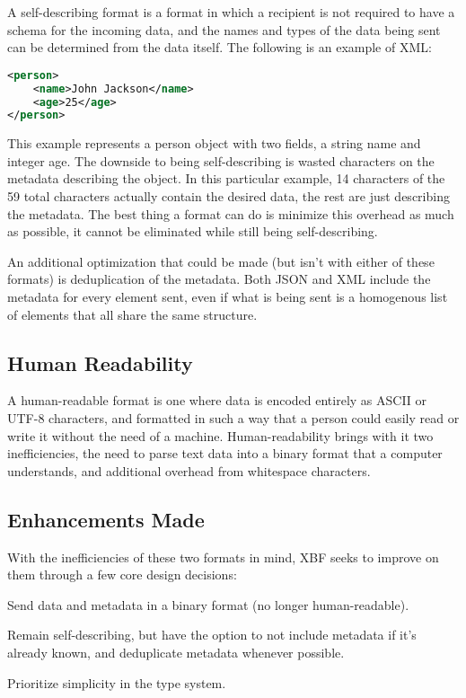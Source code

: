 \documentclass[conference]{IEEEtran}
\begin{document}
A self-describing format is a format in which a recipient is not required to have a schema for the incoming data, and the names and types of the data being sent can be determined from the data itself. The following is an example of XML:

\begin{lstlisting}[language=XML]
<person>
	<name>John Jackson</name>
	<age>25</age>
</person>
\end{lstlisting}

This example represents a person object with two fields, a string name and integer age. The downside to being self-describing is wasted characters on the metadata describing the object. In this particular example, 14 characters of the 59 total characters actually contain the desired data, the rest are just describing the metadata. The best thing a format can do is minimize this overhead as much as possible, it cannot be eliminated while still being self-describing.

An additional optimization that could be made (but isn't with either of these formats) is deduplication of the metadata. Both JSON and XML include the metadata for every element sent, even if what is being sent is a homogenous list of elements that all share the same structure.

\subsection{Human Readability}

A human-readable format is one where data is encoded entirely as ASCII or UTF-8 characters, and formatted in such a way that a person could easily read or write it without the need of a machine. Human-readability brings with it two inefficiencies, the need to parse text data into a binary format that a computer understands, and additional overhead from whitespace characters.

\subsection{Enhancements Made}

With the inefficiencies of these two formats in mind, XBF seeks to improve on them through a few core design decisions:

\begin{IEEEitemize}
	\item Send data and metadata in a binary format (no longer human-readable).
	\item Remain self-describing, but have the option to not include metadata if it's already known, and deduplicate metadata whenever possible.
	\item Prioritize simplicity in the type system.
\end{IEEEitemize}
\end{document}
